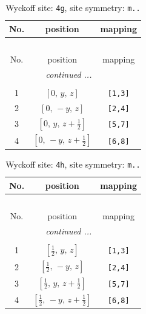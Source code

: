 \documentclass[fleqn,8pt]{jsarticle}
\begin{document}
\renewcommand{\arraystretch}{1.2}
\begin{longtable}{ccc}
\caption{Wyckoff site: {\tt 4g}, site symmetry: {\tt m..}}
 \\
 \hline \hline
No. & position & mapping \\ \hline \endfirsthead

\multicolumn{2}{l}{\tablename\ \thetable{}} \\
 \hline \hline
No. & position & mapping \\ \hline \endhead

 \hline \hline
\multicolumn{2}{r}{\footnotesize\it continued ...} \\ \endfoot

 \hline \hline
\multicolumn{2}{r}{} \\ \endlastfoot

1 & $\left[ 0,\, y,\, z \right]$ & {\tt [1,3]} \\ \hline
2 & $\left[ 0,\, - y,\, z \right]$ & {\tt [2,4]} \\ \hline
3 & $\left[ 0,\, y,\, z + \frac{1}{2} \right]$ & {\tt [5,7]} \\ \hline
4 & $\left[ 0,\, - y,\, z + \frac{1}{2} \right]$ & {\tt [6,8]} \\
\end{longtable}
\renewcommand{\arraystretch}{1.2}
\begin{longtable}{ccc}
\caption{Wyckoff site: {\tt 4h}, site symmetry: {\tt m..}}
 \\
 \hline \hline
No. & position & mapping \\ \hline \endfirsthead

\multicolumn{2}{l}{\tablename\ \thetable{}} \\
 \hline \hline
No. & position & mapping \\ \hline \endhead

 \hline \hline
\multicolumn{2}{r}{\footnotesize\it continued ...} \\ \endfoot

 \hline \hline
\multicolumn{2}{r}{} \\ \endlastfoot

1 & $\left[ \frac{1}{2},\, y,\, z \right]$ & {\tt [1,3]} \\ \hline
2 & $\left[ \frac{1}{2},\, - y,\, z \right]$ & {\tt [2,4]} \\ \hline
3 & $\left[ \frac{1}{2},\, y,\, z + \frac{1}{2} \right]$ & {\tt [5,7]} \\ \hline
4 & $\left[ \frac{1}{2},\, - y,\, z + \frac{1}{2} \right]$ & {\tt [6,8]} \\
\end{longtable}
\end{document}
